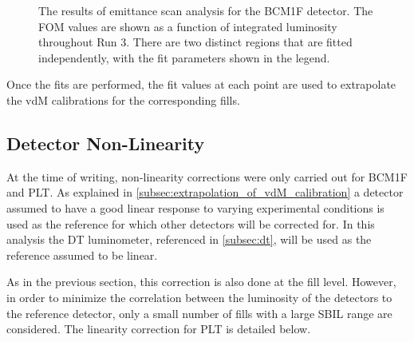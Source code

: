\begin{figure}[!htb]
	\centering
	\caption[BCM1F efficiency analysis results]{The results of emittance scan analysis for the BCM1F detector. The FOM values are shown as a function of integrated luminosity throughout Run 3. There are two distinct regions that are fitted independently, with the fit parameters shown in the legend.}
	\label{fig:efficiency_bcm1f_example}
\end{figure}

Once the fits are performed, the fit values at each point are used to extrapolate the vdM calibrations for the corresponding fills.

\subsection{Detector Non-Linearity}
\label{subsec:detector_non_linearity}

At the time of writing, non-linearity corrections were only carried out for BCM1F and PLT. As explained in \autoref{subsec:extrapolation_of_vdM_calibration} a detector assumed to have a good linear response to varying experimental conditions is used as the reference for which other detectors will be corrected for. In this analysis the DT luminometer, referenced in \autoref{subsec:dt}, will be used as the reference assumed to be linear.

As in the previous section, this correction is also done at the fill level. However, in order to minimize the correlation between the luminosity of the detectors to the reference detector, only a small number of fills with a large SBIL range are considered. The linearity correction for PLT is detailed below.

